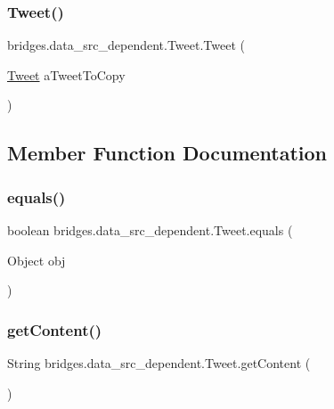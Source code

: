 \subsubsection{\texorpdfstring{Tweet()}{Tweet()}\hspace{0.1cm}{\footnotesize\ttfamily [3/3]}}
{\footnotesize\ttfamily bridges.\+data\+\_\+src\+\_\+dependent.\+Tweet.\+Tweet (\begin{DoxyParamCaption}\item[{\hyperlink{classbridges_1_1data__src__dependent_1_1_tweet}{Tweet}}]{a\+Tweet\+To\+Copy }\end{DoxyParamCaption})}



\subsection{Member Function Documentation}
\hypertarget{classbridges_1_1data__src__dependent_1_1_tweet_ae5edb76b9dd0f76b56eb40aa7c8cc077}{}\label{classbridges_1_1data__src__dependent_1_1_tweet_ae5edb76b9dd0f76b56eb40aa7c8cc077} 
\subsubsection{\texorpdfstring{equals()}{equals()}}
{\footnotesize\ttfamily boolean bridges.\+data\+\_\+src\+\_\+dependent.\+Tweet.\+equals (\begin{DoxyParamCaption}\item[{Object}]{obj }\end{DoxyParamCaption})}

\hypertarget{classbridges_1_1data__src__dependent_1_1_tweet_a9b48f1ffc14fea21eb8a3e742601974a}{}\label{classbridges_1_1data__src__dependent_1_1_tweet_a9b48f1ffc14fea21eb8a3e742601974a} 
\subsubsection{\texorpdfstring{get\+Content()}{getContent()}}
{\footnotesize\ttfamily String bridges.\+data\+\_\+src\+\_\+dependent.\+Tweet.\+get\+Content (\begin{DoxyParamCaption}{ }\end{DoxyParamCaption})}

